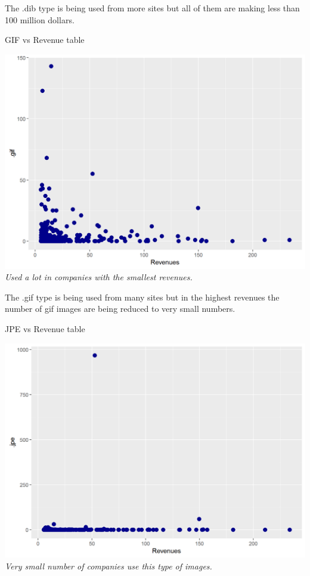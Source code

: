 \documentclass{article}
\begin{document}
The .dib type is being used from more sites but all of them are making less than 100 million dollars.
\begin{table}[H]
\centering
\caption{GIF vs Revenue table}
\begin{center}
\includegraphics[scale=0.5]{../R/photos/56_gif_rev.png}    \\
\textit{Used a lot in companies with the smallest revenues.}
\end{center}
\end{table}
The .gif type is being used from many sites but in the highest revenues the number of gif images are being reduced to very small numbers.
\begin{table}[H]
\centering
\caption{JPE vs Revenue table}
\begin{center}
\includegraphics[scale=0.5]{../R/photos/57_jpe_rev.png}    \\
\textit{Very small number of companies use this type of images.}
\end{center}
\end{table}
\end{document}
